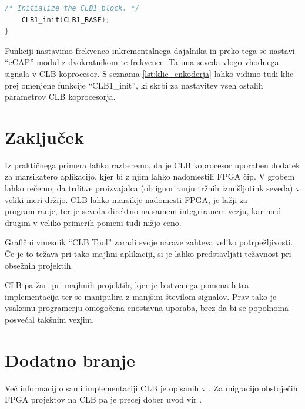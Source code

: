 \documentclass[a4paper]{article}
\begin{document}
\begin{sloppypar}
\begin{lstlisting}[language=C,
                   caption={Implementacija funkcije za nastavitev 
                            inkrementalnega dajalnika},
                   label={lst:klic_enkoderja}]
    /* Initialize the CLB1 block. */
    CLB1_init(CLB1_BASE);
}
\end{lstlisting}

Funkciji nastavimo frekvenco inkrementalnega dajalnika in preko tega se nastavi
``eCAP'' modul z dvokratnikom te frekvence. Ta ima seveda vlogo vhodnega
signala v CLB koprocesor. S seznama \ref{lst:klic_enkoderja} lahko vidimo tudi
klic prej omenjene funkcije ``CLB1\_init'', ki skrbi za nastavitev vseh ostalih
parametrov CLB koprocesorja.



\section{Zaključek}
Iz praktičnega primera lahko razberemo, da je CLB koprocesor uporaben
dodatek za marsikatero aplikacijo, kjer bi z njim lahko nadomestili FPGA čip. V
grobem lahko rečemo, da trditve proizvajalca (ob ignoriranju tržnih
izmišljotink seveda) v veliki meri držijo. CLB lahko marsikje nadomesti FPGA,
je lažji za programiranje, ter je seveda direktno na samem integriranem vezju,
kar med drugim v veliko primerih pomeni tudi nižjo ceno.

Grafični vmesnik ``CLB Tool'' zaradi svoje narave zahteva veliko
potrpežljivosti. Če je to težava pri tako majhni aplikaciji, si je lahko
predstavljati težavnost pri obsežnih projektih.

CLB pa žari pri majhnih projektih, kjer je bistvenega pomena hitra
implementacija ter se manipulira z manjšim številom signalov. Prav tako je
vsakemu programerju omogočena enostavna uporaba, brez da bi se popolnoma
posvečal takšnim vezjim.



\section{Dodatno branje}
Več informacij o sami implementaciji CLB je opisanih v \cite{clb-designing}. Za
migracijo obstoječih FPGA projektov na CLB pa je precej dober uvod vir
\cite{fpga-to-clb}.



\printbibliography



\end{sloppypar}
\end{document}
